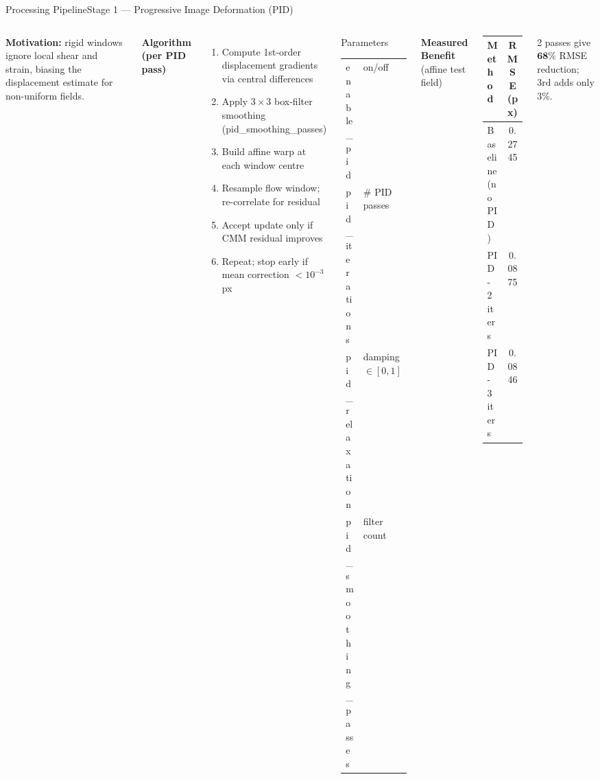 \documentclass[9pt, aspectratio=169]{beamer}
\newcommand{\param}[1]{{\ttfamily\color{accent!60!black}#1}}
\newcommand{\theadrow}{\rowcolor{accentlight}}
\begin{document}
\begin{frame}{Processing Pipeline}{Stage 1 --- Progressive Image Deformation (PID)}
  \begin{columns}[t]
    
    \begin{minipage}[t][\columnheight][t]{\linewidth}
    \vspace{0.4cm}
      \textbf{Motivation:} rigid windows ignore local shear and strain, biasing the displacement estimate for non-uniform fields.

      \vspace{0.3em}
      \textbf{Algorithm (per PID pass)}
      \begin{enumerate}
        \small
        \item Compute 1st-order displacement gradients via central differences
        \item Apply $3\times3$ box-filter smoothing (\param{pid\_smoothing\_passes})
        \item Build affine warp at each window centre
        \item Resample flow window; re-correlate for residual
        \item Accept update only if CMM residual improves
        \item Repeat; stop early if mean correction $<10^{-3}$\,px
      \end{enumerate}
      
    \end{minipage}
    \vspace{-0.25cm}
      \begin{block}{Parameters}
        \small
        \begin{tabular}{ll}
          \param{enable\_pid}           & on/off \\
          \param{pid\_iterations}       & \# PID passes \\
          \param{pid\_relaxation}       & damping $\in[0,1]$ \\
          \param{pid\_smoothing\_passes}& filter count \\
        \end{tabular}
      \end{block}
      \vspace{0.3em}
      \textbf{Measured Benefit} (affine test field)
      \begin{center}
        \small
        \begin{tabular}{lc}
          \toprule
          \theadrow Method & RMSE (px) \\
          \midrule
          Baseline (no PID)  & 0.2745 \\
          PID - 2 iters    & 0.0875 \\
          PID - 3 iters    & 0.0846 \\
          \bottomrule
        \end{tabular}
      \end{center}
      \small 2 passes give $\mathbf{68\%}$ RMSE reduction; 3rd adds only $3\%$.
  \end{columns}
\end{frame}
\end{document}
